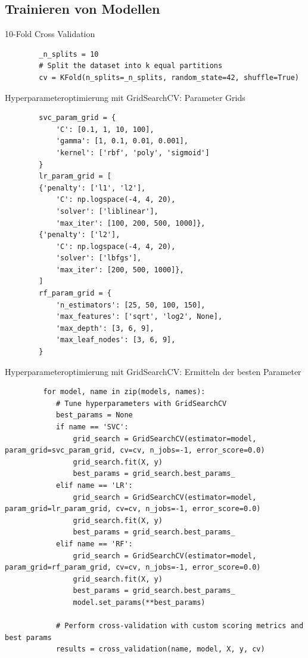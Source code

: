 \documentclass{sdqbeamer}
\begin{document}
\subsection{Trainieren von Modellen}
\begin{frame}[fragile]{10-Fold Cross Validation}
	\begin{lstlisting}
		_n_splits = 10
		# Split the dataset into k equal partitions
		cv = KFold(n_splits=_n_splits, random_state=42, shuffle=True)
	\end{lstlisting}
\end{frame}
\begin{frame}[fragile, shrink=20]{Hyperparameteroptimierung mit GridSearchCV: Parameter Grids}
	\begin{lstlisting}
		svc_param_grid = {
			'C': [0.1, 1, 10, 100],
			'gamma': [1, 0.1, 0.01, 0.001],
			'kernel': ['rbf', 'poly', 'sigmoid']
		}
		lr_param_grid = [
		{'penalty': ['l1', 'l2'],
			'C': np.logspace(-4, 4, 20),
			'solver': ['liblinear'],
			'max_iter': [100, 200, 500, 1000]},
		{'penalty': ['l2'],
			'C': np.logspace(-4, 4, 20),
			'solver': ['lbfgs'],
			'max_iter': [200, 500, 1000]},
		]
		rf_param_grid = {
			'n_estimators': [25, 50, 100, 150],
			'max_features': ['sqrt', 'log2', None],
			'max_depth': [3, 6, 9],
			'max_leaf_nodes': [3, 6, 9],
		}
	\end{lstlisting}
\end{frame}
\begin{frame}[fragile,shrink=20]{Hyperparameteroptimierung mit GridSearchCV: Ermitteln der besten Parameter}
	\begin{lstlisting}
		 for model, name in zip(models, names):
			# Tune hyperparameters with GridSearchCV
			best_params = None
			if name == 'SVC':
				grid_search = GridSearchCV(estimator=model, param_grid=svc_param_grid, cv=cv, n_jobs=-1, error_score=0.0)
				grid_search.fit(X, y)
				best_params = grid_search.best_params_
			elif name == 'LR':
				grid_search = GridSearchCV(estimator=model, param_grid=lr_param_grid, cv=cv, n_jobs=-1, error_score=0.0)
				grid_search.fit(X, y)
				best_params = grid_search.best_params_
			elif name == 'RF':
				grid_search = GridSearchCV(estimator=model, param_grid=rf_param_grid, cv=cv, n_jobs=-1, error_score=0.0)
				grid_search.fit(X, y)
				best_params = grid_search.best_params_
				model.set_params(**best_params)
			
			# Perform cross-validation with custom scoring metrics and best params
			results = cross_validation(name, model, X, y, cv)
	\end{lstlisting}
\end{frame}
\end{document}
